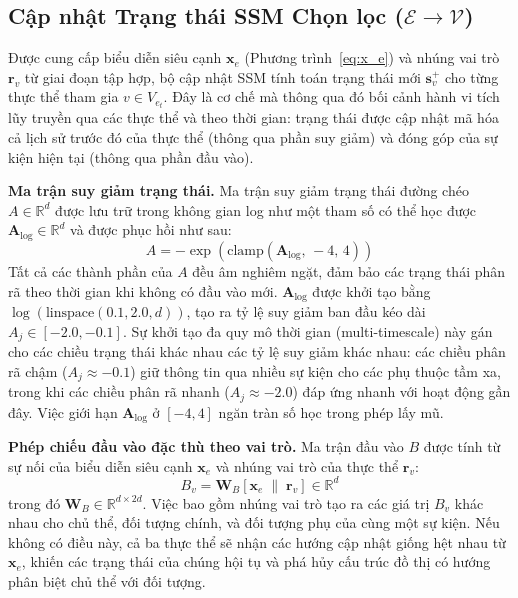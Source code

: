 \documentclass[letterpaper,twocolumn,10pt]{article}
\begin{document}
\subsection{Cập nhật Trạng thái SSM Chọn lọc ($\mathcal{E} \to \mathcal{V}$)}
\label{sec:ssm_update}

Được cung cấp biểu diễn siêu cạnh $\mathbf{x}_e$ (Phương trình~\ref{eq:x_e}) và nhúng vai trò $\mathbf{r}_v$ từ giai đoạn tập hợp, bộ cập nhật SSM tính toán trạng thái mới $\mathbf{s}_v^{+}$ cho từng thực thể tham gia $v \in V_{e_t}$. Đây là cơ chế mà thông qua đó bối cảnh hành vi tích lũy truyền qua các thực thể và theo thời gian: trạng thái được cập nhật mã hóa cả lịch sử trước đó của thực thể (thông qua phần suy giảm) và đóng góp của sự kiện hiện tại (thông qua phần đầu vào).

\textbf{Ma trận suy giảm trạng thái.} Ma trận suy giảm trạng thái đường chéo $A \in \mathbb{R}^d$ được lưu trữ trong không gian log như một tham số có thể học được $\mathbf{A}_{\log} \in \mathbb{R}^d$ và được phục hồi như sau:
\begin{equation}
    A = -\exp\!\left(\text{clamp}(\mathbf{A}_{\log},\, -4,\, 4)\right)
    \label{eq:A}
\end{equation}
Tất cả các thành phần của $A$ đều âm nghiêm ngặt, đảm bảo các trạng thái phân rã theo thời gian khi không có đầu vào mới. $\mathbf{A}_{\log}$ được khởi tạo bằng $\log(\text{linspace}(0.1, 2.0, d))$, tạo ra tỷ lệ suy giảm ban đầu kéo dài $A_j \in [-2.0, -0.1]$. Sự khởi tạo đa quy mô thời gian (multi-timescale) này gán cho các chiều trạng thái khác nhau các tỷ lệ suy giảm khác nhau: các chiều phân rã chậm ($A_j \approx -0.1$) giữ thông tin qua nhiều sự kiện cho các phụ thuộc tầm xa, trong khi các chiều phân rã nhanh ($A_j \approx -2.0$) đáp ứng nhanh với hoạt động gần đây. Việc giới hạn $\mathbf{A}_{\log}$ ở $[-4, 4]$ ngăn tràn số học trong phép lấy mũ.

\textbf{Phép chiếu đầu vào đặc thù theo vai trò.} Ma trận đầu vào $B$ được tính từ sự nối của biểu diễn siêu cạnh $\mathbf{x}_e$ và nhúng vai trò của thực thể $\mathbf{r}_v$:
\begin{equation}
    B_v = \mathbf{W}_B [\mathbf{x}_e \;\|\; \mathbf{r}_v] \in \mathbb{R}^d
    \label{eq:B}
\end{equation}
trong đó $\mathbf{W}_B \in \mathbb{R}^{d \times 2d}$. Việc bao gồm nhúng vai trò tạo ra các giá trị $B_v$ khác nhau cho chủ thể, đối tượng chính, và đối tượng phụ của cùng một sự kiện. Nếu không có điều này, cả ba thực thể sẽ nhận các hướng cập nhật giống hệt nhau từ $\mathbf{x}_e$, khiến các trạng thái của chúng hội tụ và phá hủy cấu trúc đồ thị có hướng phân biệt chủ thể với đối tượng.
\end{document}
